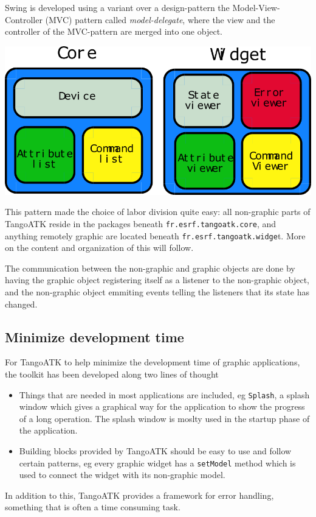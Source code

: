 Swing is developed using a variant over a design-pattern the Model-View-Controller
(MVC) pattern called \emph{model-delegate}, where the
view and the controller of the MVC-pattern are merged into one object.

\begin{center}
\includegraphics[scale=0.6]{atk/img/core-widget}\\
\par\end{center}

This pattern made the choice of labor division quite easy: all non-graphic
parts of TangoATK reside in the packages beneath \texttt{fr.esrf.tangoatk.core},
and anything remotely graphic are located beneath \texttt{fr.esrf.tangoatk.widge}t.
More on the content and organization of this will follow.

The communication between the non-graphic and graphic objects are
done by having the graphic object registering itself as a listener
to the non-graphic object, and the non-graphic object emmiting events
telling the listeners that its state has changed.

\subsection{Minimize development time}

For TangoATK to help minimize the development time of graphic applications,
the toolkit has been developed along two lines of thought
\begin{itemize}
\item Things that are needed in most applications are included, eg \texttt{Splash},
a splash window which gives a graphical way for the
application to show the progress of a long operation. The splash window
is moslty used in the startup phase of the application.
\item Building blocks provided by TangoATK should be easy to use and follow
certain patterns, eg every graphic widget has a \texttt{setModel}
method which is used to connect the widget with its non-graphic model. 
\end{itemize}
In addition to this, TangoATK provides a framework for error handling,
something that is often a time consuming task.


